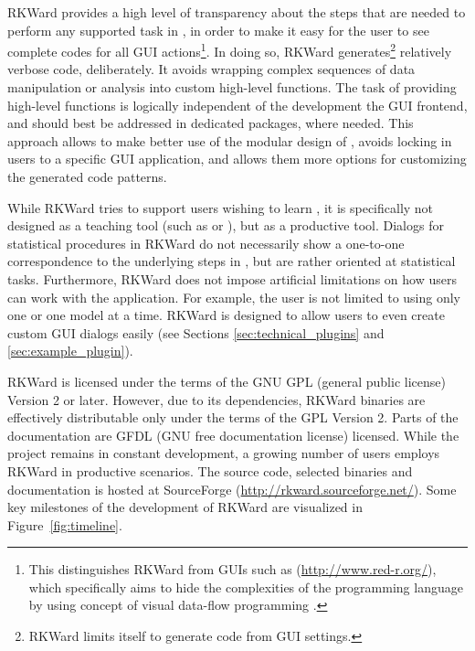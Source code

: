 RKWard provides a high level of transparency about the steps that are needed to
perform any supported task in , in order to make it easy for the user to see
complete codes for all GUI actions\footnote{
  This distinguishes RKWard from  GUIs such as  (\url{http://www.red-r.org/}), which 
  specifically aims to hide the complexities of the  programming language by using concept of visual data-flow
  programming \citep{Sutherland1966}.
}. In doing so, RKWard generates\footnote{
  RKWard limits itself to generate  code from GUI settings.
} relatively verbose code, deliberately. It avoids wrapping complex sequences of data
manipulation or analysis into custom high-level  functions. The task of
providing high-level functions is logically independent of the development the
GUI frontend, and should best be addressed in dedicated  packages, where needed.
This approach allows to make better use of the modular design of , avoids
locking in users to a specific GUI application, and allows them more options for
customizing the generated code patterns.

While RKWard tries to support users wishing to learn , it is specifically not
designed as a teaching tool (such as  or ), but as
a productive tool. Dialogs for statistical procedures in RKWard do not
necessarily show a one-to-one correspondence to the underlying steps in , but are
rather oriented at statistical tasks. Furthermore, RKWard does not impose
artificial limitations on how users can work with the application. For example,
the user is not limited to using only one  or one model at a
time. RKWard is designed to allow users to even create custom GUI dialogs
easily (see Sections \ref{sec:technical_plugins} and \ref{sec:example_plugin}).

RKWard is licensed under the terms of the GNU GPL (general public license) Version 2
or later. However, due to its dependencies, RKWard binaries are effectively
distributable only under the terms of the GPL Version 2. Parts of the documentation are
GFDL (GNU free documentation license) licensed. While the project remains in constant development, a growing
number of users employs RKWard in productive scenarios. The source code,
selected binaries and documentation is hosted at SourceForge
(\url{http://rkward.sourceforge.net/}). Some key milestones of the development of RKWard are
visualized in Figure~\ref{fig:timeline}.

